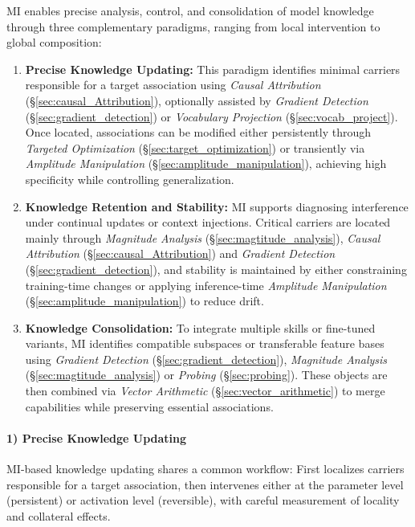 \documentclass[11pt,letterpaper]{mystyle}
\begin{document}
\begin{tcolorbox}[takeawaysbox, title={Summary of Application Paradigms}]
  MI enables precise analysis, control, and consolidation of model knowledge through three complementary paradigms, ranging from local intervention to global composition:
  \begin{enumerate}[leftmargin=*, label=\arabic*)]
      \item \textbf{Precise Knowledge Updating:} This paradigm identifies minimal carriers responsible for a target association using \textit{Causal Attribution} (\S\ref{sec:causal_Attribution}), optionally assisted by \textit{Gradient Detection} (\S\ref{sec:gradient_detection}) or \textit{Vocabulary Projection} (\S\ref{sec:vocab_project}). Once located, associations can be modified either persistently through \textit{Targeted Optimization} (\S\ref{sec:target_optimization}) or transiently via \textit{Amplitude Manipulation} (\S\ref{sec:amplitude_manipulation}), achieving high specificity while controlling generalization.
  
      \item \textbf{Knowledge Retention and Stability:} MI supports diagnosing interference under continual updates or context injections. Critical carriers are located mainly through \textit{Magnitude Analysis} (\S\ref{sec:magtitude_analysis}), \textit{Causal Attribution} (\S\ref{sec:causal_Attribution}) and \textit{Gradient Detection} (\S\ref{sec:gradient_detection}), and stability is maintained by either constraining training-time changes or applying inference-time \textit{Amplitude Manipulation} (\S\ref{sec:amplitude_manipulation}) to reduce drift.  
  
      \item \textbf{Knowledge Consolidation:} To integrate multiple skills or fine-tuned variants, MI identifies compatible subspaces or transferable feature bases using \textit{Gradient Detection} (\S\ref{sec:gradient_detection}), \textit{Magnitude Analysis} (\S\ref{sec:magtitude_analysis}) or \textit{Probing} (\S\ref{sec:probing}). These objects are then combined via \textit{Vector Arithmetic} (\S\ref{sec:vector_arithmetic}) to merge capabilities while preserving essential associations. 
  \end{enumerate}
  \end{tcolorbox}
  
  \paragraph{1) Precise Knowledge Updating}
  MI-based knowledge updating shares a common workflow: First localizes carriers responsible for a target association, then intervenes either at the parameter level (persistent) or activation level (reversible), with careful measurement of locality and collateral effects.
  
\end{document}
